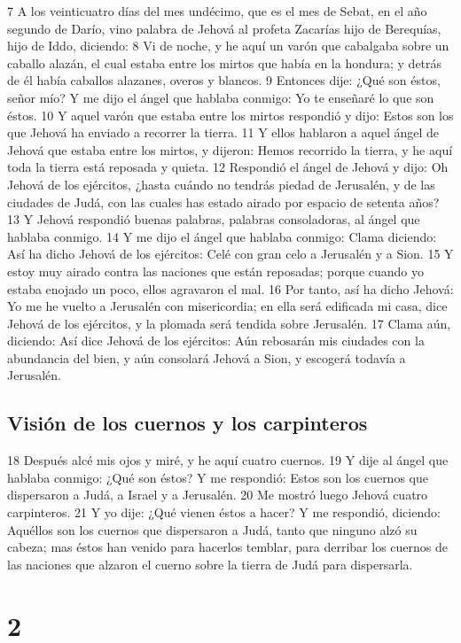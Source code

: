 7 A los veinticuatro días del mes undécimo, que es el mes de Sebat, en el año segundo de Darío, vino palabra de Jehová al profeta Zacarías hijo de Berequías, hijo de Iddo, diciendo:
8 Vi de noche, y he aquí un varón que cabalgaba sobre un caballo alazán, el cual estaba entre los mirtos que había en la hondura; y detrás de él había caballos alazanes, overos y blancos. 
9 Entonces dije: ¿Qué son éstos, señor mío? Y me dijo el ángel que hablaba conmigo: Yo te enseñaré lo que son éstos.
10 Y aquel varón que estaba entre los mirtos respondió y dijo: Estos son los que Jehová ha enviado a recorrer la tierra.
11 Y ellos hablaron a aquel ángel de Jehová que estaba entre los mirtos, y dijeron: Hemos recorrido la tierra, y he aquí toda la tierra está reposada y quieta.
12 Respondió el ángel de Jehová y dijo: Oh Jehová de los ejércitos, ¿hasta cuándo no tendrás piedad de Jerusalén, y de las ciudades de Judá, con las cuales has estado airado por espacio de setenta años?
13 Y Jehová respondió buenas palabras, palabras consoladoras, al ángel que hablaba conmigo.
14 Y me dijo el ángel que hablaba conmigo: Clama diciendo: Así ha dicho Jehová de los ejércitos: Celé con gran celo a Jerusalén y a Sion.
15 Y estoy muy airado contra las naciones que están reposadas; porque cuando yo estaba enojado un poco, ellos agravaron el mal.
16 Por tanto, así ha dicho Jehová: Yo me he vuelto a Jerusalén con misericordia; en ella será edificada mi casa, dice Jehová de los ejércitos, y la plomada será tendida sobre Jerusalén.
17 Clama aún, diciendo: Así dice Jehová de los ejércitos: Aún rebosarán mis ciudades con la abundancia del bien, y aún consolará Jehová a Sion, y escogerá todavía a Jerusalén.

\section*{Visión de los cuernos y los carpinteros}

18 Después alcé mis ojos y miré, y he aquí cuatro cuernos.
19 Y dije al ángel que hablaba conmigo: ¿Qué son éstos? Y me respondió: Estos son los cuernos que dispersaron a Judá, a Israel y a Jerusalén.
20 Me mostró luego Jehová cuatro carpinteros.
21 Y yo dije: ¿Qué vienen éstos a hacer? Y me respondió, diciendo: Aquéllos son los cuernos que dispersaron a Judá, tanto que ninguno alzó su cabeza; mas éstos han venido para hacerlos temblar, para derribar los cuernos de las naciones que alzaron el cuerno sobre la tierra de Judá para dispersarla.

\chapter{2}

